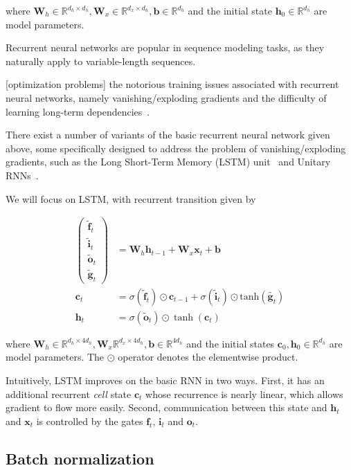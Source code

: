 \documentclass{article} %
\newcommand{\vect}[1]{\mathbf{#1}}
\newcommand{\mat}[1]{\mathbf{#1}}
\newcommand{\ewprod}{\odot}
\newcommand{\reals}{\mathbb{R}}
\begin{document}
where $\mat{W}_h \in \reals^{d_h \times d_h},
       \mat{W}_x \in \reals^{d_x \times d_h},
       \vect{b} \in \reals^{d_h}$
  and the initial state $\vect{h}_0 \in \reals^{d_h}$
  are model parameters.

Recurrent neural networks are popular in sequence modeling tasks, as they naturally apply to variable-length sequences.

[optimization problems]
 the notorious training issues associated with recurrent neural networks, namely vanishing/exploding gradients and the difficulty of learning long-term dependencies~\cite{bengiolongterm}.

There exist a number of variants of the basic recurrent neural network given above, some specifically designed to address the problem of vanishing/exploding gradients, such as the Long Short-Term Memory (LSTM) unit~\cite{lstm} and Unitary RNNs~\cite{urnn}.

We will focus on LSTM, with recurrent transition given by

\begin{align}
\left(\begin{array}{ccc}
\tilde{\vect{f}}_t \\
\tilde{\vect{i}}_t \\
\tilde{\vect{o}}_t \\
\tilde{\vect{g}}_t
\end{array}\right)
 &=
 \mat{W}_h \vect{h}_{t-1} +
 \mat{W}_x \vect{x}_t +
 \vect{b}
\\
\vect{c}_t &= \sigma(\tilde{\vect{f}}_t) \ewprod \vect{c}_{t-1} +
              \sigma(\tilde{\vect{i}}_t) \ewprod \mathrm{tanh}(\tilde{\vect{g}_t}) \\
\vect{h}_t &= \sigma(\tilde{\vect{o}}_t) \ewprod \tanh(\vect{c}_t)
\end{align}

where $\vect{W}_h \in \reals^{d_h \times 4 d_h}, \vect{W}_x \reals^{d_x \times 4 d_h}, \vect{b} \in \reals^{4 d_h}$ and the initial states $\vect{c}_0, \vect{h}_0 \in \reals^{d_h}$ are model parameters.
The $\ewprod$ operator denotes the elementwise product.

Intuitively, LSTM improves on the basic RNN in two ways.
First, it has an additional recurrent \emph{cell} state $\vect{c}_t$ whose recurrence is nearly linear, which allows gradient to flow more easily.
Second, communication between this state and $\vect{h}_t$ and $\vect{x}_t$ is controlled by the gates $\vect{f}_t$, $\vect{i}_t$ and $\vect{o}_t$.

\subsection{Batch normalization}
\end{document}
